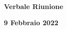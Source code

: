 \begin{center}
  \Huge\textbf{Verbale Riunione}
\end{center}

\begin{center}
  \LARGE\textbf{9 Febbraio 2022}
\end{center}

\bigskip
\bigskip
\bigskip
